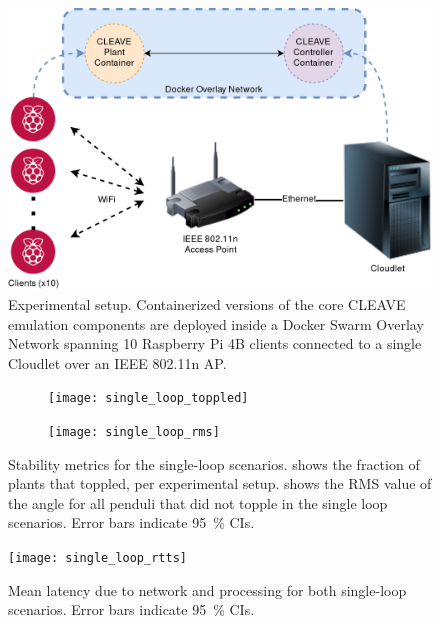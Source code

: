\begin{figure}
    \centering
    \includegraphics[width=.95\columnwidth]{images/CLEAVE_experiment_setup}
    \caption{Experimental setup. Containerized versions of the core CLEAVE emulation components are deployed inside a Docker Swarm Overlay Network spanning \num{10} Raspberry Pi 4B clients connected to a single Cloudlet over an IEEE 802.11n \ac{AP}.}\label{fig:cleave:expsetup}
\end{figure}

\begin{figure}[h]
    \centering
    \begin{subfigure}[t]{.5\textwidth}
        \centering
        \texttt{[image: single\_loop\_toppled]}
        \caption{}%
        \label{fig:single:topple}
    \end{subfigure}%
    \begin{subfigure}[t]{.5\textwidth}
        \centering
        \texttt{[image: single\_loop\_rms]}
        \caption{}\label{fig:single:rms}
    \end{subfigure}%
    \caption[caption]{
        Stability metrics for the single-loop scenarios.
         shows the fraction of plants that toppled, per experimental setup.
         shows the \ac{RMS} value of the angle for all penduli that did not topple in the single loop scenarios.
        Error bars indicate \SI{95}{\percent} \acp{CI}.
        }%
    \label{fig:single:stability}
\end{figure}

\begin{figure}
    \centering
    \texttt{[image: single\_loop\_rtts]}
    \caption{
        Mean latency due to network and processing for both single-loop scenarios.
        Error bars indicate \SI{95}{\percent} \acp{CI}.
    }\label{fig:single:rtt}
\end{figure}

